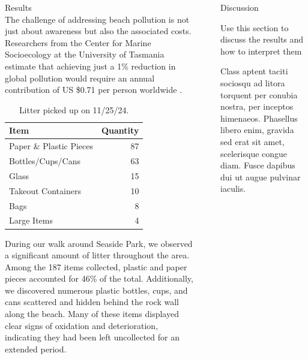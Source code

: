 \documentclass[final]{beamer}
\newlength{\sepwidth}
\newlength{\colwidth}
\newcommand{\separatorcolumn}{\begin{column}{\sepwidth}\end{column}}
\begin{document}
\begin{frame}[t]
\begin{columns}[t]
\begin{column}{\colwidth}
\begin{block}{Results}
            \\
            The challenge of addressing beach pollution is not just about awareness but also the associated costs. Researchers from the Center for Marine Socioecology at the University of Tasmania estimate that achieving just a 1\% reduction in global pollution would require an annual contribution of US \$0.71 per person worldwide \cite{MUTUKU2022114220}.
          \begin{table}
            \centering
            \begin{tabular}{l r }
              \toprule
              \textbf{Item} & \textbf{Quantity} \\
              \midrule
              Paper \& Plastic Pieces& 87\\
              Bottles/Cups/Cans& 63\\
              Glass& 15\\
              Takeout Containers& 10\\
              Bags& 8\\
              Large Items& 4\\
              \bottomrule
            \end{tabular}
            \caption{Litter picked up on 11/25/24.}
          \end{table}
          During our walk around Seaside Park, we observed a significant amount of litter throughout the area. Among the 187 items collected, plastic and paper pieces accounted for 46\% of the total. Additionally, we discovered numerous plastic bottles, cups, and cans scattered and hidden behind the rock wall along the beach. Many of these items displayed clear signs of oxidation and deterioration, indicating they had been left uncollected for an extended period.
        \end{block}

      \end{column}

      \separatorcolumn

      \begin{column}{\colwidth}

        \begin{block}{Discussion}
        
          Use this section to discuss the results and how to interpret them \par
          Class aptent taciti sociosqu ad litora torquent per conubia nostra, per
          inceptos himenaeos. Phasellus libero enim, gravida sed erat sit amet,
          scelerisque congue diam. Fusce dapibus dui ut augue pulvinar iaculis.


\end{block}
\end{column}
\end{columns}
\end{frame}
\end{document}
